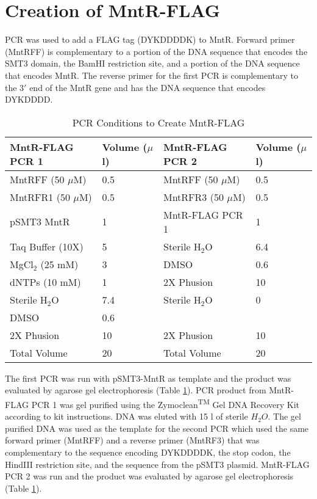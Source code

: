 \documentclass[12pt,twoside]{reedthesis}
\begin{document}
 \section{Creation of MntR-FLAG}
PCR was used to add a FLAG tag (DYKDDDDK) to MntR. Forward primer (MntRFF) is complementary to a portion of the DNA sequence that encodes the SMT3 domain, the BamHI restriction site, and a portion of the DNA sequence that encodes MntR. The reverse primer for the first PCR is complementary to the 3$'$ end of the MntR gene and has the DNA sequence that encodes DYKDDDD. 
\begin{table}[H]
	\caption[PCR Conditions to Create MntR-FLAG]{PCR Conditions to Create MntR-FLAG} 
	\centering
	\label{MntRFLAGPCR}
	\begin{tabular}{|l | l| |l| l|}
		\hline
		MntR-FLAG PCR 1 & Volume ($\mu$l) & MntR-FLAG PCR 2  & Volume ($\mu$l) \\
		\hline 
		MntRFF (50 $\mu$M) & 0.5 & MntRFF (50 $\mu$M) & 0.5   \\ 
		MntRFR1 (50 $\mu$M) & 0.5 & MntRFR3 (50 $\mu$M) & 0.5 \\  			
		pSMT3 MntR & 1  & MntR-FLAG PCR 1 &  1  \\
		Taq Buffer (10X) & 5 & Sterile H$_{2}$O & 6.4 \\ 
		MgCl$_{2}$ (25 mM) & 3 & DMSO & 0.6 \\  
		dNTPs (10 mM) & 1 & 2X Phusion & 10 \\     
		Sterile H$_{2}$O & 7.4  & Sterile H$_{2}$O & 0  \\
		DMSO & 0.6 &  &  \\
		2X Phusion & 10 & 2X Phusion & 10 \\
		\hline   
		Total Volume & 20 & Total Volume & 20  \\
		\hline
	\end{tabular}
\end{table}

 
The first PCR was run with pSMT3-MntR as template and the product was evaluated by agarose gel electrophoresis (Table \ref{MntRFLAGPCR}). PCR product from MntR-FLAG PCR 1 was gel purified using the Zymoclean\textsuperscript{TM} Gel DNA Recovery Kit according to kit instructions. DNA was eluted with 15 \micro l of sterile $H_{2}O$. The gel purified DNA was used as the template for the second PCR which used the same forward primer (MntRFF) and a reverse primer (MntRF3) that was complementary to the sequence encoding DYKDDDDK, the stop codon, the HindIII restriction site, and the sequence from the pSMT3 plasmid. MntR-FLAG PCR 2 was run and the product was evaluated by agarose gel electrophoresis (Table \ref{MntRFLAGPCR}). 
\end{document}
